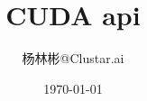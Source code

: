 \documentclass{article}
\title{CUDA api}
\author{杨林彬@Clustar.ai}   %
\date{\today}       %
\begin{document}
\maketitle
\renewcommand{\contentsname}{Contents}
\tableofcontents
\pagebreak
\end{document}
